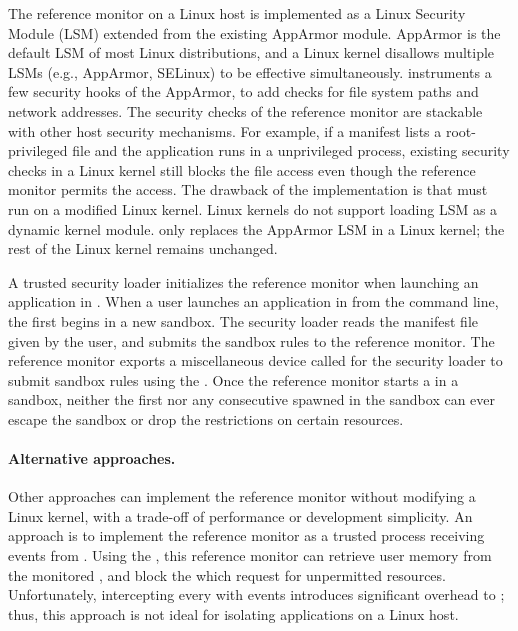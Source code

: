 The reference monitor on a Linux host
is implemented as a Linux Security Module (LSM) extended from the existing AppArmor module.
AppArmor is the default LSM of most Linux distributions,
and a Linux kernel disallows multiple LSMs (e.g., AppArmor, SELinux) to be effective simultaneously.
\graphene{} instruments
a few security hooks of the AppArmor, to add checks for file system paths
and network addresses.
The security checks of the reference monitor are stackable with other host security mechanisms.
For example, if a manifest lists a root-privileged file and the \graphene{} application runs in a unprivileged process,
existing security checks in a Linux kernel
still blocks the file access even though the reference monitor permits the access.
The drawback of the implementation
is that \graphene{} must run on a modified Linux kernel.
Linux kernels do not support loading LSM as a dynamic kernel module.
\graphene{} only replaces
the AppArmor LSM in a Linux kernel; the rest of the Linux kernel remains unchanged.


A trusted security loader initializes the reference monitor
when launching an application in \graphene{}.
When a user launches an application in \graphene{} from the command line,
the first \picoproc{} begins in a new sandbox.
The security loader
reads the manifest file given by the user,
and submits the sandbox rules to the reference monitor.
The reference monitor exports a miscellaneous device called 
for the security loader to submit sandbox rules using the  \linuxapi{}.
Once the reference monitor
starts a \picoproc{} in a sandbox, neither the first \picoproc{} nor any consecutive \picoprocs{} spawned in the sandbox can ever escape the sandbox or drop the restrictions on certain resources.


\paragraph{Alternative approaches.}
Other approaches can implement the reference monitor without modifying a Linux kernel, with a trade-off of performance or development simplicity.
An approach is to implement the reference monitor as a trusted process receiving  events from \graphene{} \picoprocs{}.
Using the  \linuxapi{}, this reference monitor can retrieve user memory from the monitored \picoprocs{},
and block the \linuxapis{} which request for unpermitted resources.
Unfortunately, intercepting every \linuxapis{} with  events introduces significant overhead to \hostapis{};
thus, this approach is not ideal for isolating \graphene{} applications on a Linux host.


